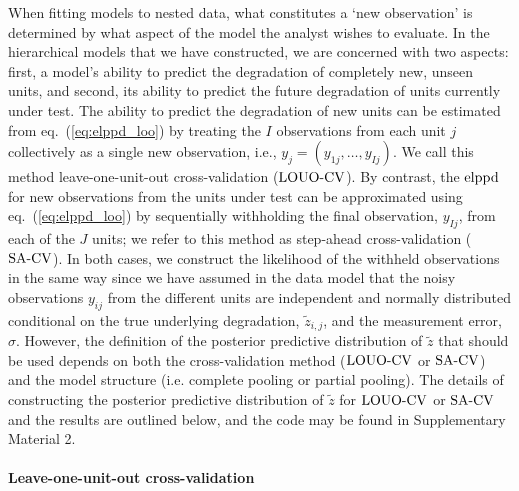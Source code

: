 \documentclass{article}
\begin{document}
When fitting models to nested data, what constitutes a `new observation' is determined by what aspect of the model the analyst wishes to evaluate. In the hierarchical models that we have constructed, we are concerned with two aspects: first, a model's ability to predict the degradation of completely new, unseen units, and second, its ability to predict the future degradation of units currently under test. The ability to predict the degradation of new units can be estimated from eq.~(\ref{eq:elppd_loo}) by treating the $I$ observations from each unit $j$ collectively as a single new observation, i.e., $y_j = (y_{1j}, \ldots, y_{Ij})$. We call this method leave-one-unit-out cross-validation ($\hbox{LOUO-CV}$). By contrast, the $\hbox{elppd}$ for new observations from the units under test can be approximated using eq.~(\ref{eq:elppd_loo}) by sequentially withholding the final observation, $y_{Ij}$, from each of the $J$ units; we refer to this method as step-ahead cross-validation ($\hbox{SA-CV}$). In both cases, we construct the likelihood of the withheld observations in the same way since we have assumed in the data model that the noisy observations $y_{ij}$ from the different units are independent and normally distributed conditional on the true underlying degradation, $\tilde{z}_{i, j}$, and the measurement error, $\sigma$. However, the definition of the posterior predictive distribution of $\tilde{z}$ that should be used depends on both the cross-validation method ($\hbox{LOUO-CV}$ or $\hbox{SA-CV}$) and the model structure (i.e. complete pooling or partial pooling). The details of constructing the posterior predictive distribution of $\tilde{z}$ for $\hbox{LOUO-CV}$ or $\hbox{SA-CV}$ and the results are outlined below, and the code may be found in Supplementary Material 2.

\paragraph{Leave-one-unit-out cross-validation} 
\end{document}
